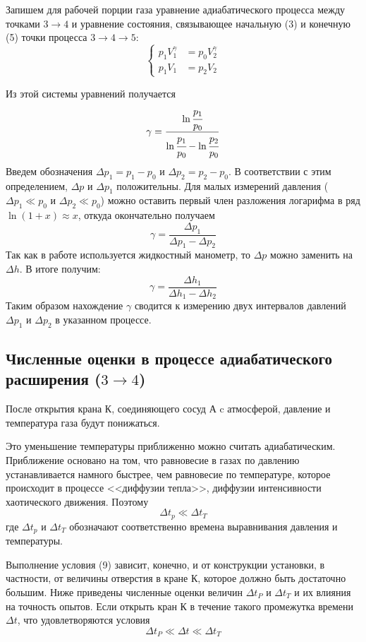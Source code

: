 \documentclass[a4paper,12pt]{article}
\theoremstyle{plain} %
\theoremstyle{definition} %
\theoremstyle{remark} %
\begin{document}
Запишем для рабочей порции газа уравнение адиабатического процесса между точками $3\rightarrow4$ и уравнение состояния, связывающее начальную (3) и конечную (5) точки процесса $3\rightarrow4\rightarrow5$:
\[
\left\{
\begin{aligned}
p_1V_1^\gamma &= p_0V_2^\gamma \\
p_1V_1 &= p_2V_2
\end{aligned}
\right.
\]

Из этой системы уравнений получается
\begin{equation}
\gamma = \frac{\ln\cfrac{p_1}{p_0}}{\ln \cfrac{p_1}{p_0} - \ln\cfrac{p_2}{p_0}}
\end{equation}
Введем обозначения $\Delta p_1 = p_1 - p_0$ и $\Delta p_2 = p_2 - p_0$. В соответствии с этим определением, $\Delta p$ и $\Delta p_1$ положительны. Для малых измерений давления ($\Delta p_1 \ll p_0$ и $\Delta p_2 \ll p_0$) можно оставить первый член разложения логарифма в ряд $\ln(1+x) \approx x$, откуда окончательно получаем
\begin{equation}
\gamma = \frac{\Delta p_1}{\Delta p_1 - \Delta p_2}
\end{equation}
Так как в работе используется жидкостный манометр, то $\Delta p$ можно заменить на $\Delta h$. В итоге получим:
\begin{equation}
\gamma = \frac{\Delta h_1}{\Delta h_1 - \Delta h_2}
\end{equation}
Таким образом нахождение $\gamma$ сводится к измерению двух интервалов давлений $\Delta p_1$ и $\Delta p_2$ в указанном процессе.
\subsection{Численные оценки в процессе адиабатического расширения ($3\rightarrow4$) }
После открытия крана $\text{К}$, соединяющего сосуд $\text{А}$ c атмосферой, давление и температура газа будут понижаться. 

Это уменьшение температуры приближенно можно считать адиабатическим. Приближение основано на том, что равновесие в газах по давлению устанавливается намного быстрее, чем равновесие по температуре, которое происходит в процессе <<диффузии тепла>>, диффузии интенсивности хаотического движения. Поэтому
\begin{equation}
\Delta t_p \ll \Delta t_T
\end{equation}
где $\Delta t_p$ и $\Delta t_T$ обозначают соответственно времена выравнивания давления и температуры.

Выполнение условия (9) зависит, конечно, и от конструкции установки, в частности, от величины отверстия в кране $\text{К}$, которое должно быть достаточно большим. Ниже приведены численные оценки величин $\Delta t_P$ и $\Delta t_T$ и их влияния на точность опытов. Если открыть кран $\text{К}$ в течение такого промежутка времени $\Delta t$, что удовлетворяются условия
\begin{equation}
\Delta t_P \ll \Delta t \ll \Delta t_T
\end{equation}
\end{document}
